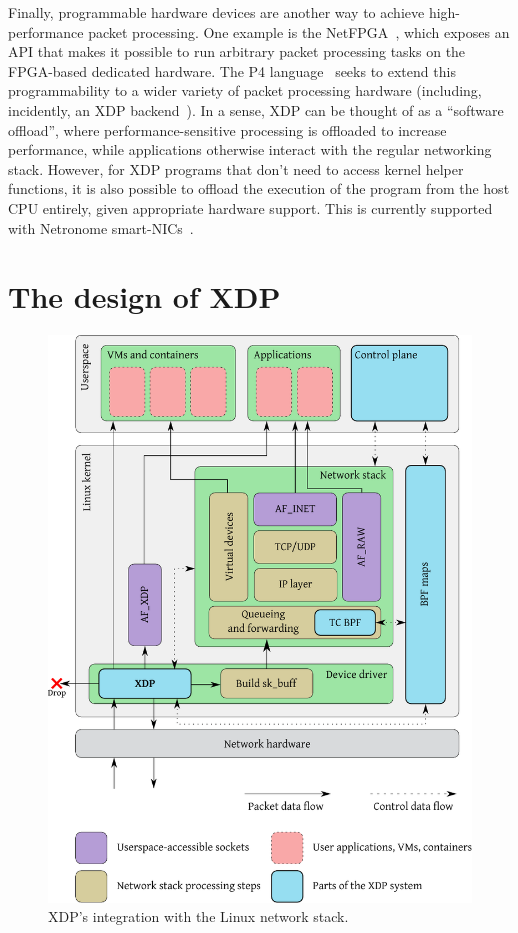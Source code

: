 \documentclass[sigconf]{acmart}
\begin{document}
Finally, programmable hardware devices are another way to achieve
high-performance packet processing. One example is the
NetFPGA~\cite{lockwood2007netfpga}, which exposes an API that makes it possible
to run arbitrary packet processing tasks on the FPGA-based dedicated hardware.
The P4 language~\cite{bosshart2014p4} seeks to extend this programmability to a
wider variety of packet processing hardware (including, incidently, an XDP
backend~\cite{p4xdp}). In a sense, XDP can be thought of as a ``software
offload'', where performance-sensitive processing is offloaded to increase
performance, while applications otherwise interact with the regular networking
stack. However, for XDP programs that don't need to access kernel helper
functions, it is also possible to offload the execution of the program from the
host CPU entirely, given appropriate hardware support. This is currently
supported with Netronome smart-NICs~\cite{xdp-offload}.

\section{The design of XDP}
\label{sec:design}

\begin{figure}[t]
\centering
\includegraphics[width=\linewidth]{figures/kernel-diagram.pdf}
\caption{\label{fig:xdp-kernel} XDP's integration with the Linux network stack.}
\end{figure}
\end{document}
